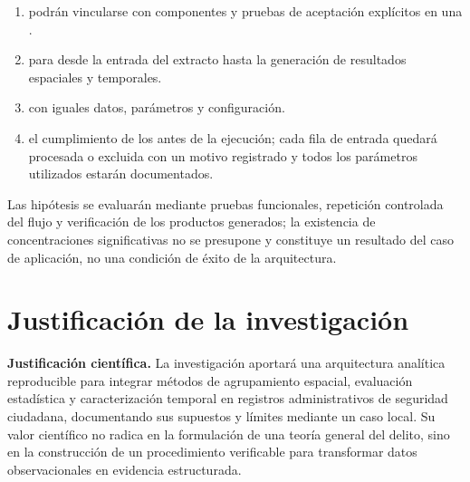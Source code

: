 \begin{enumerate}[label=H\textsubscript{\arabic*}:]
    \item[H\textsubscript{1}:]  podrán vincularse con componentes y pruebas de aceptación explícitos en una .
    \item[H\textsubscript{2}:]  para  desde la entrada del extracto hasta la generación de resultados espaciales y temporales.
    \item[H\textsubscript{3}:]   con iguales datos, parámetros y configuración.
    \item[H\textsubscript{4}:]  el cumplimiento de los  antes de la ejecución; cada fila de entrada quedará procesada o excluida con un motivo registrado y todos los parámetros utilizados estarán documentados.
\end{enumerate}

\noindent Las hipótesis se evaluarán mediante pruebas funcionales, repetición controlada del flujo y verificación de los productos generados; la existencia de concentraciones significativas no se presupone y constituye un resultado del caso de aplicación, no una condición de éxito de la arquitectura.

\section{Justificación de la investigación}
\label{sec:justificacion}

\textbf{Justificación científica.} La investigación aportará una arquitectura analítica reproducible para integrar métodos de agrupamiento espacial, evaluación estadística y caracterización temporal en registros administrativos de seguridad ciudadana, documentando sus supuestos y límites mediante un caso local. Su valor científico no radica en la formulación de una teoría general del delito, sino en la construcción de un procedimiento verificable para transformar datos observacionales en evidencia estructurada.

